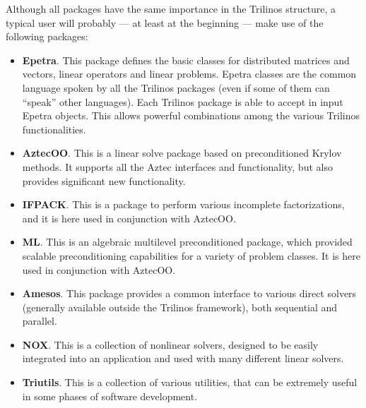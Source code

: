 Although all packages have the same importance in the Trilinos
structure, a typical user will probably --- at least at the beginning
--- make use of the following packages:
\begin{itemize} 
\item {\bf Epetra}. This package defines the basic classes for
  distributed matrices and vectors, linear operators and linear
  problems. Epetra classes are the common language spoken by all the
  Trilinos packages (even if some of them can ``speak'' other
  languages). Each Trilinos package is able to accept in input Epetra
  objects. This allows powerful combinations among the various Trilinos
  functionalities.
\item {\bf AztecOO}. This is a linear solve package based on
  preconditioned Krylov methods. It supports all the Aztec interfaces
  and functionality, but also provides significant new functionality.
\item {\bf IFPACK}. This is a package to perform various incomplete
  factorizations, and it is here used in conjunction with AztecOO.
\item {\bf ML}. This is an algebraic multilevel preconditioned package, which
  provided scalable preconditioning capabilities for a variety of
  problem classes. It is here used in conjunction with AztecOO.
\item {\bf Amesos}. This package provides a common interface to various
  direct solvers (generally available outside the Trilinos framework),
  both sequential and parallel.
\item {\bf NOX}. This is a collection of nonlinear solvers, designed to
  be easily integrated into an application and used with many different
  linear solvers.
\item {\bf Triutils}. This is a collection of various utilities, that
  can be extremely useful in some phases of software development.
\end{itemize}

